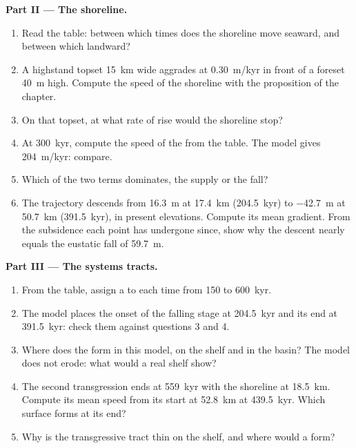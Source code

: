 \begin{problem}
\medskip\noindent\textbf{Part II --- The shoreline.}
\begin{enumerate}[resume]
\item Read the table: between which times does the shoreline move seaward,
  and between which landward?
\item A highstand topset \qty{15}{km} wide aggrades at \qty{0.30}{m/kyr}
  in front of a foreset \qty{40}{m} high. Compute the speed of the
  shoreline with the proposition of the chapter.
\item On that topset, at what rate of rise would the shoreline stop?
\item At \qty{300}{kyr}, compute the speed of the  from
  the table. The model gives \qty{204}{m/kyr}: compare.
\item Which of the two terms dominates, the supply or the fall?
\item The trajectory descends from \qty{16.3}{m} at \qty{17.4}{km}
  (\qty{204.5}{kyr}) to \qty{-42.7}{m} at \qty{50.7}{km}
  (\qty{391.5}{kyr}), in present elevations. Compute its mean gradient.
  From the subsidence each point has undergone since, show why the descent
  nearly equals the eustatic fall of \qty{59.7}{m}.
\end{enumerate}

\medskip\noindent\textbf{Part III --- The systems tracts.}
\begin{enumerate}[resume]
\item From the table, assign a  to each time from 150 to
  \qty{600}{kyr}.
\item The model places the onset of the falling stage at \qty{204.5}{kyr}
  and its end at \qty{391.5}{kyr}: check them against questions 3 and 4.
\item Where does the  form in this model, on the shelf and
  in the basin? The model does not erode: what would a real shelf show?
\item The second transgression ends at \qty{559}{kyr} with the shoreline at
  \qty{18.5}{km}. Compute its mean speed from its start at \qty{52.8}{km} at
  \qty{439.5}{kyr}. Which surface forms at its end?
\item Why is the transgressive tract thin on the shelf, and where would a
   form?
\end{enumerate}


\end{problem}
